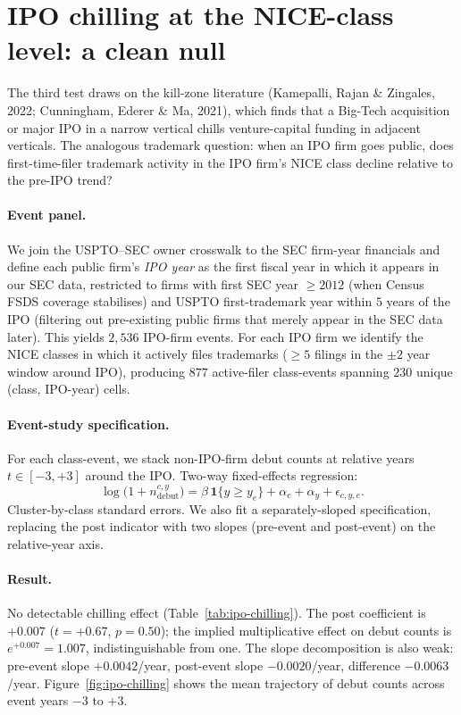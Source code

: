 \documentclass[11pt]{article}
\begin{document}
\section{IPO chilling at the NICE-class level: a clean null}
\label{sec:ipo-chilling}

The third test draws on the kill-zone literature
(Kamepalli, Rajan \& Zingales, 2022; Cunningham, Ederer \& Ma, 2021),
which finds that a Big-Tech acquisition or major IPO in a narrow
vertical chills venture-capital funding in adjacent verticals. The
analogous trademark question: when an IPO firm goes public, does
first-time-filer trademark activity in the IPO firm's NICE class
decline relative to the pre-IPO trend?

\paragraph{Event panel.} We join the USPTO--SEC owner crosswalk to
the SEC firm-year financials and define each public firm's
\emph{IPO year} as the first fiscal year in which it appears in our
SEC data, restricted to firms with first SEC year $\ge 2012$ (when
Census FSDS coverage stabilises) and USPTO first-trademark year
within $5$ years of the IPO (filtering out pre-existing public firms
that merely appear in the SEC data later). This yields $2{,}536$
IPO-firm events. For each IPO firm we identify the NICE classes in
which it actively files trademarks ($\ge 5$ filings in the
$\pm 2$ year window around IPO), producing $877$ active-filer
class-events spanning $230$ unique (class, IPO-year) cells.

\paragraph{Event-study specification.} For each class-event, we
stack non-IPO-firm debut counts at relative years $t \in [-3, +3]$
around the IPO. Two-way fixed-effects regression:
$$\log\bigl(1 + n_\text{debut}^{c,y}\bigr) = \beta\,\mathbf{1}\{y \ge y_e\}
   + \alpha_c + \alpha_y + \epsilon_{c,y,e}.$$
Cluster-by-class standard errors. We also fit a separately-sloped
specification, replacing the post indicator with two slopes
(pre-event and post-event) on the relative-year axis.

\paragraph{Result.} No detectable chilling effect
(Table~\ref{tab:ipo-chilling}). The post coefficient is $+0.007$
($t = +0.67$, $p = 0.50$); the implied multiplicative effect on
debut counts is $e^{+0.007} = 1.007$, indistinguishable from one.
The slope decomposition is also weak: pre-event slope
$+0.0042$/year, post-event slope $-0.0020$/year, difference
$-0.0063$/year. Figure~\ref{fig:ipo-chilling} shows the mean
trajectory of debut counts across event years $-3$ to $+3$.
\end{document}
